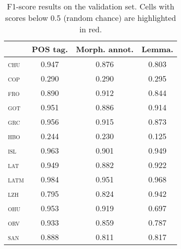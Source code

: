 \documentclass{../acl_latex.tex}
\begin{document}
\begin{table}[t]
\centering
\begin{tabular}{lccc}
\toprule
                 & POS tag. & Morph. annot. & Lemma. \\ \midrule
\textsc{chu}     &  0.947   &  0.876        & 0.803  \\ 
\textsc{cop}     &  \cellcolor{red!25}0.290   & \cellcolor{red!25}  0.290 & \cellcolor{red!25} 0.295  \\ 
\textsc{fro}     &  0.890   &  0.912        & 0.844  \\
\textsc{got}     &  0.951   &  0.886        & 0.914  \\
\textsc{grc}     &  0.956   &  0.915        & 0.873  \\
\textsc{hbo}     &  \cellcolor{red!25}0.244   & \cellcolor{red!25}  0.230 & \cellcolor{red!25} 0.125  \\
\textsc{isl}     &  0.963   &  0.901        & 0.949  \\
\textsc{lat}     &  0.949   &  0.882        & 0.922  \\
\textsc{latm}    &  0.984   &  0.951        & 0.968  \\
\textsc{lzh}     &  0.795   &  0.824        & 0.942  \\
\textsc{ohu}     &  0.953   &  0.919        & 0.697  \\
\textsc{orv}     &  0.933   &  0.859        & 0.787  \\
\textsc{san}     &  0.888   &  0.811        & 0.817  \\ \bottomrule 
\end{tabular}
\caption{
    F1-score results on the validation set.
    Cells with scores below 0.5 (random chance) are highlighted in \colorbox{red!25}{red}.
}
\label{table:validation_results}
\end{table}
\end{document}
